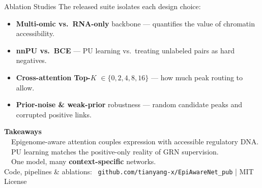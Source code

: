 \documentclass[final,25pt]{beamer}
\newcommand{\keyword}[1]{\textcolor{primary}{\bfseries #1}}
\begin{document}
\begin{frame}[t]
\begin{columns}[t]
\begin{column}{0.315\textwidth}
\begin{card}[accent]{Ablation Studies}
  \small The released suite isolates each design choice:
  \vspace{6pt}
  \begin{itemize}\setlength\itemsep{6pt}
    \item \keyword{Multi-omic vs.\ RNA-only} backbone — quantifies the value
          of chromatin accessibility.
    \item \keyword{nnPU vs.\ BCE} — PU learning vs.\ treating unlabeled pairs
          as hard negatives.
    \item \keyword{Cross-attention Top-$K$} $\in\{0,2,4,8,16\}$ — how much
          peak routing to allow.
    \item \keyword{Prior-noise \& weak-prior} robustness — random candidate
          peaks and corrupted positive links.
  \end{itemize}
\end{card}

\vspace{1.15cm}

\begin{tcolorbox}[enhanced,arc=12pt,boxrule=0pt,
    colback=ink,coltext=white,
    interior style={left color=ink,right color=accent!80!ink},
    left=22pt,right=22pt,top=18pt,bottom=18pt,
    drop fuzzy shadow={black!20}]
  {\large\bfseries\color{amber} Takeaways}\\[8pt]
  \small
  \faCheckCircle~~Epigenome-aware attention couples expression with
  accessible regulatory DNA.\\[6pt]
  \faCheckCircle~~PU learning matches the positive-only reality of GRN
  supervision.\\[6pt]
  \faCheckCircle~~One model, many \keyword{\color{white}context-specific}
  networks.\\[12pt]
  {\footnotesize\color{white!80}
  Code, pipelines \& ablations: \faGithub~\texttt{github.com/tianyang-x/EpiAwareNet\_pub} \; | \; MIT License}
\end{tcolorbox}

\end{column}
\end{columns}

\vspace{0.55cm}


\end{frame}
\end{document}
